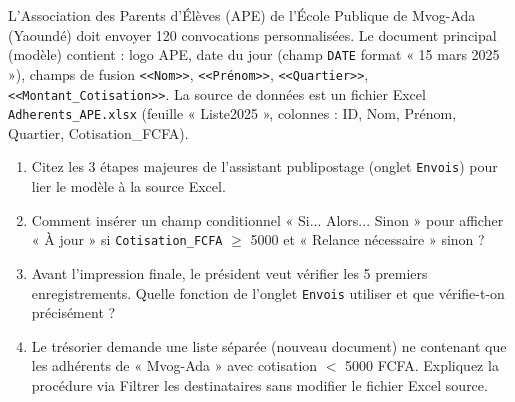 \documentclass[11pt]{article}
\begin{document}
\begin{exercice}
L'Association des Parents d'Élèves (APE) de l'École Publique de Mvog-Ada (Yaoundé) doit envoyer 120 convocations personnalisées. Le document principal (modèle) contient : logo APE, date du jour (champ \texttt{DATE} format « 15 mars 2025 »), champs de fusion \texttt{<<Nom>>}, \texttt{<<Prénom>>}, \texttt{<<Quartier>>}, \texttt{<<Montant\_Cotisation>>}. La source de données est un fichier Excel \texttt{Adherents\_APE.xlsx} (feuille « Liste2025 », colonnes : ID, Nom, Prénom, Quartier, Cotisation\_FCFA).
\begin{enumerate}
    \item Citez les 3 étapes majeures de l'assistant publipostage (onglet \texttt{Envois}) pour lier le modèle à la source Excel.
    \item Comment insérer un champ conditionnel « Si... Alors... Sinon » pour afficher « À jour » si \texttt{Cotisation\_FCFA} $\ge$ 5000 et « Relance nécessaire » sinon ?
    \item Avant l'impression finale, le président veut vérifier les 5 premiers enregistrements. Quelle fonction de l'onglet \texttt{Envois} utiliser et que vérifie-t-on précisément ?
    \item Le trésorier demande une liste séparée (nouveau document) ne contenant que les adhérents de « Mvog-Ada » avec cotisation $<$ 5000 FCFA. Expliquez la procédure via \og Filtrer les destinataires \fg sans modifier le fichier Excel source.
\end{enumerate}
\end{exercice}
\end{document}
